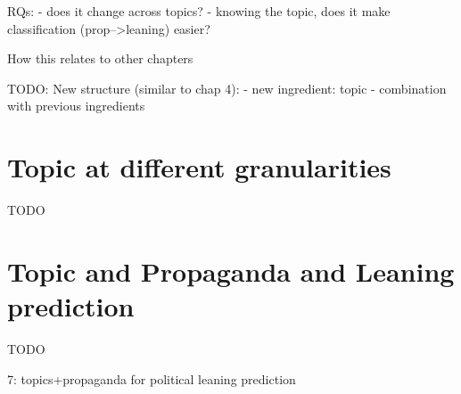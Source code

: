 \label{chap:topics}


RQs:
- does it change across topics?
- knowing the topic, does it make classification (prop-->leaning) easier?

How this relates to other chapters


TODO: New structure (similar to chap 4):
- new ingredient: topic
- combination with previous ingredients

\section{Topic at different granularities}

TODO

\section{Topic and Propaganda and Leaning prediction}

TODO

7: topics+propaganda for political leaning prediction